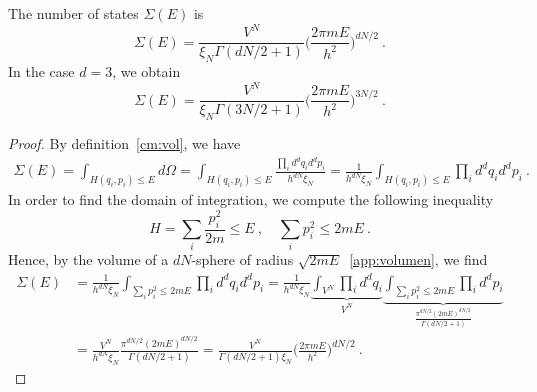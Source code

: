     The number of states $\Sigma(E)$ is 
    \begin{equation*}
        \Sigma(E) = \frac{V^{N}}{\xi_N \Gamma(dN/2 + 1)} \Big ( \frac{2 \pi m E}{h^2}\Big)^{dN/2} ~.
    \end{equation*}
    In the case $d = 3$, we obtain 
    \begin{equation*}
        \Sigma(E) = \frac{V^{N}}{\xi_N \Gamma(3N/2 + 1)} \Big ( \frac{2 \pi m E}{h^2}\Big)^{3N/2} ~.
    \end{equation*}
    \begin{proof}
        By definition~\eqref{cm:vol}, we have
        \begin{equation*}
        \begin{aligned}
            \Sigma (E) = \int_{H (q_i, p_i) \leq E} d\Omega = \int_{H (q_i, p_i) \leq E} \frac{\prod_i d^d q_i d^d p_i}{h^{dN} \xi_N} = \frac{1}{h^{dN} \xi_N} \int_{H (q_i, p_i) \leq E} \prod_i d^d q_i d^d p_i ~.
        \end{aligned}
        \end{equation*}
        In order to find the domain of integration, we compute the following inequality
        \begin{equation*}
            H = \sum_i \frac{p^2_i}{2m} \leq E ~, \quad \sum_i p^2_i \leq 2mE ~.
        \end{equation*}
        Hence, by the volume of a $dN$-sphere of radius $\sqrt{2mE}$~\eqref{app:volumen}, we find
        \begin{equation*}
        \begin{aligned}
            \Sigma (E) & = \frac{1}{h^{dN} \xi_N} \int_{\sum_i p^2_i \leq 2mE} \prod_i d^d q_i d^d p_i = \frac{1}{h^{dN} \xi_N} \underbrace{\int_{V^N} \prod_i d^d q_i}_{V^N} \underbrace{\int_{\sum_i p^2_i \leq 2mE} \prod_i d^d p_i}_{\frac{\pi^{dN/2} (2mE)^{dN/2}}{\Gamma (dN/2 + 1)}} \\ & = \frac{V^N}{h^{dN} \xi_N} \frac{\pi^{dN/2} (2mE)^{dN/2}}{\Gamma (dN/2 + 1)} = \frac{V^N}{\Gamma (dN/2 + 1) \xi_N} \Big (\frac{2 \pi m E}{h^2} \Big)^{dN/2} ~.
        \end{aligned}
        \end{equation*}
    \end{proof}

